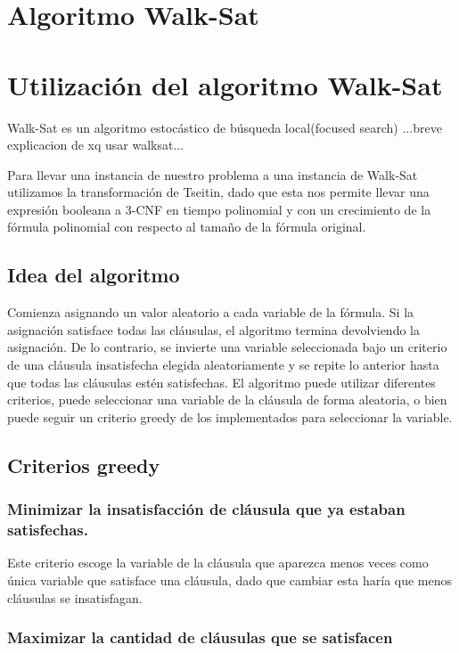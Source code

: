 \documentclass[article]{llncs}
\begin{document}
\section{Algoritmo Walk-Sat}


\section{Utilización del algoritmo Walk-Sat}

Walk-Sat es un algoritmo estocástico de búsqueda local(focused search) ...breve explicacion de xq usar walksat...

Para llevar una instancia de nuestro problema a una instancia de Walk-Sat utilizamos la transformación de Tseitin, dado que esta
nos permite llevar una expresión booleana a 3-CNF en tiempo polinomial y con un crecimiento de la fórmula polinomial con
respecto al tamaño de la fórmula original.

\subsection{Idea del algoritmo}

Comienza asignando un valor aleatorio a cada variable de la fórmula. Si la asignación satisface todas las cláusulas, 
el algoritmo termina devolviendo la asignación. De lo contrario, se invierte una variable seleccionada bajo un criterio de
una cláusula insatisfecha elegida aleatoriamente y se repite lo anterior hasta que todas las cláusulas estén satisfechas. 
El algoritmo puede utilizar diferentes criterios, puede seleccionar una variable de la cláusula de forma aleatoria, o bien 
puede seguir un criterio greedy de los implementados para seleccionar la variable.

\subsection{Criterios greedy}

\subsubsection{Minimizar la insatisfacción de cláusula que ya estaban satisfechas.}

Este criterio escoge la variable de la cláusula que aparezca menos veces como única variable que satisface una cláusula, dado que cambiar esta
haría que menos cláusulas se insatisfagan.

\subsubsection{Maximizar la cantidad de cláusulas que se satisfacen}
\end{document}
